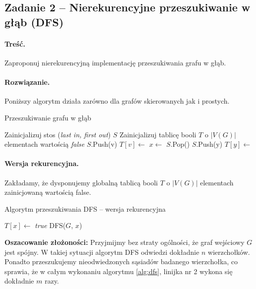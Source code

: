 \subsection{Zadanie 2 -- Nierekurencyjne przeszukiwanie w głąb (DFS)}
\label{zad:dfsnr}
\paragraph{Treść.} Zaproponuj nierekurencyjną implementację
przeszukiwania grafu w głąb.

\paragraph{Rozwiązanie.}
Poniższy algorytm działa zarówno dla grafów skierowanych
jak i prostych.

\begin{algorithm}[H]
	\caption{Przeszukiwanie grafu w głąb}\label{Zadanie22a}
	\begin{algorithmic}[1]
		\State Zainicjalizuj stos (\textit{last in, first out}) $S$
		\State Zainicjalizuj tablicę booli $T$ o $|V(G)|$ elementach wartością 
		\textit{false}
		\State $S$.Push(v)
		\State $T[v] \gets$ \false
		\State $x \gets$ $S$.Pop()
		\State $S$.Push(y)
		\State $T[y] \gets$ \true 
		\EndIf
		\EndWhile
		\EndWhile
		\EndProcedure
	\end{algorithmic}
\end{algorithm}

\paragraph{Wersja rekurencyjna.} Zakładamy, że dysponujemy globalną
tablicą booli $T$ o $|V(G)|$ elementach zainicjowaną wartością 
\textsf{false}.

\begin{algorithm}[H]
	\caption{Algorytm przeszukiwania DFS -- wersja rekurencyjna}\label{Zadanie22b}
	\begin{algorithmic}[1]
		\State $T[x] \gets$ \textit{true}
		\State \textsc{DFS}($G$, $x$)
		\EndIf
		\EndWhile
		\EndProcedure
	\end{algorithmic}
	\label{alg:dfs}
\end{algorithm}

\textbf{Oszacowanie złożoności:} Przyjmijmy bez straty ogólności, że graf wejściowy
$G$ jest spójny. W takiej sytuacji algorytm DFS odwiedzi dokładnie $n$ wierzchołków. Ponadto
przeszukujemy nieodwiedzonych sąsiadów badanego wierzchołka, co sprawia, że w całym
wykonaniu algorytmu \ref{alg:dfs}, linijka nr 2 wykona się dokładnie $m$ razy.

